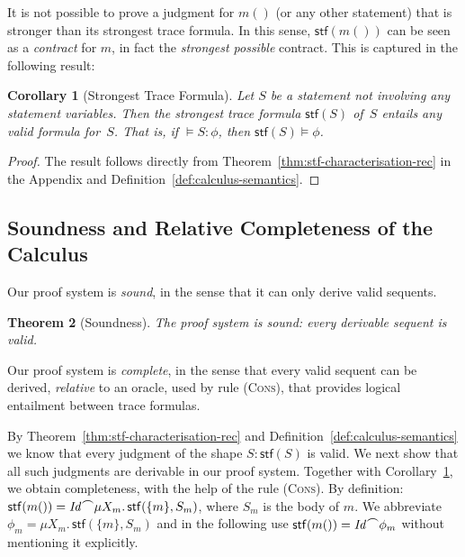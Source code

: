 \documentclass[10pt,a4paper]{amsart}
\newtheorem{theorem}{Theorem}[section]
\newtheorem{corollary}[theorem]{Corollary}
\theoremstyle{definition}
\newcommand{\chop}[0]{\raisebox{1ex}{$\frown$}}
\newcommand{\stfs}[1]{\mathsf{stf} (#1)}
\newcommand{\stfh}[2]{\mathsf{stf}(#1, #2)}
\newcommand{\judge}[2]{#1 : #2}
\begin{document}
It is not possible to prove a judgment for $m()$ (or any other
statement) that is stronger than its strongest trace formula. In this
sense, $\stfs{m()}$ can be seen as a \emph{contract} for $m$, in fact
the \emph{strongest possible} contract. This is captured in the
following result:

\begin{corollary}[Strongest Trace Formula]
  \label{cor:stf-strongest}
  Let $S$ be a statement not involving any statement variables. Then
  the strongest trace formula $\stfs{S}$ of~$S$ entails any valid
  formula for~$S$.
  That is, if $\models \judge{S}{\phi}$, then $\stfs{S} \models \phi$.
\end{corollary}

\begin{proof}
  The result follows directly from
  Theorem~\ref{thm:stf-characterisation-rec} in the Appendix and
  Definition~\ref{def:calculus-semantics}.  %
\end{proof}


\subsection{Soundness and Relative Completeness of the Calculus} 

Our proof system is \emph{sound}, in the sense that it can only
derive valid sequents.
%

\begin{theorem}[Soundness]
  \label{thm:calculus-soundness}
  The proof system is sound: every derivable sequent is valid.
\end{theorem}



Our proof system is \emph{complete}, in the sense that every valid
sequent can be derived, \emph{relative} to an oracle, used by rule
(\textsc{Cons}), that provides logical entailment between trace
formulas.

By Theorem~\ref{thm:stf-characterisation-rec} and 
Definition~\ref{def:calculus-semantics} we know that every judgment
of the shape $\judge{S}{\stfs{S}}$ is valid. 
%
We next show that all such judgments are derivable in our proof system.
%
Together with Corollary~\ref{cor:stf-strongest}, we obtain completeness,
with the help of the rule (\textsc{Cons}).
%
By definition:
$
  \stfs{m()}=\mathit{Id}\chop\mu X_m.\,\stfh{\{m\}}{S_m} %
$,
%
where $S_m$ is the body of $m$. We abbreviate
$\phi_m=\mu X_m.\,\stfh{\{m\}}{S_m}$ and in the following use
$\stfs{m()}=\mathit{Id}\chop\phi_m$ without mentioning it explicitly.
\end{document}
